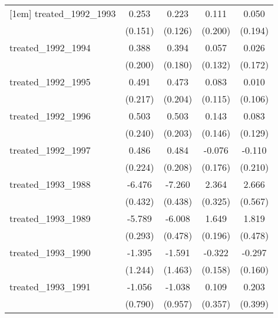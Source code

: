 {\begin{tabular}{l*{4}{c}}
[1em]
treated\_1992\_1993&       0.253         &       0.223         &       0.111         &       0.050         \\
            &     (0.151)         &     (0.126)         &     (0.200)         &     (0.194)         \\
[1em]
treated\_1992\_1994&       0.388         &       0.394\sym{*}  &       0.057         &       0.026         \\
            &     (0.200)         &     (0.180)         &     (0.132)         &     (0.172)         \\
[1em]
treated\_1992\_1995&       0.491\sym{*}  &       0.473\sym{*}  &       0.083         &       0.010         \\
            &     (0.217)         &     (0.204)         &     (0.115)         &     (0.106)         \\
[1em]
treated\_1992\_1996&       0.503\sym{*}  &       0.503\sym{*}  &       0.143         &       0.083         \\
            &     (0.240)         &     (0.203)         &     (0.146)         &     (0.129)         \\
[1em]
treated\_1992\_1997&       0.486\sym{*}  &       0.484\sym{*}  &      -0.076         &      -0.110         \\
            &     (0.224)         &     (0.208)         &     (0.176)         &     (0.210)         \\
[1em]
treated\_1993\_1988&      -6.476\sym{***}&      -7.260\sym{***}&       2.364\sym{***}&       2.666\sym{***}\\
            &     (0.432)         &     (0.438)         &     (0.325)         &     (0.567)         \\
[1em]
treated\_1993\_1989&      -5.789\sym{***}&      -6.008\sym{***}&       1.649\sym{***}&       1.819\sym{***}\\
            &     (0.293)         &     (0.478)         &     (0.196)         &     (0.478)         \\
[1em]
treated\_1993\_1990&      -1.395         &      -1.591         &      -0.322\sym{*}  &      -0.297         \\
            &     (1.244)         &     (1.463)         &     (0.158)         &     (0.160)         \\
[1em]
treated\_1993\_1991&      -1.056         &      -1.038         &       0.109         &       0.203         \\
            &     (0.790)         &     (0.957)         &     (0.357)         &     (0.399)         \\

\end{tabular}}
